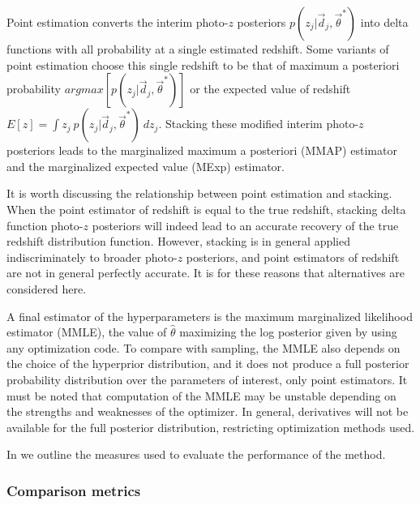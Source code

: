 Point estimation converts the interim photo-$z$ posteriors $p(z_{j}|\vec{d}_{j},\vec{\theta}^{*})$ into delta functions with all probability at a single estimated redshift.  
Some variants of point estimation choose this single redshift to be that of maximum a posteriori probability $argmax[p(z_{j}|\vec{d}_{j},\vec{\theta}^{*})]$ or the expected value of redshift $E[z]=\int z_{j}\ p(z_{j}|\vec{d}_{j},\vec{\theta}^{*})\ dz_{j}$.  
Stacking these modified interim photo-$z$ posteriors leads to the marginalized maximum a posteriori (MMAP) estimator and the marginalized expected value (MExp) estimator.

It is worth discussing the relationship between point estimation and stacking.  
When the point estimator of redshift is equal to the true redshift, stacking delta function photo-$z$ posteriors will indeed lead to an accurate recovery of the true redshift distribution function.  
However, stacking is in general applied indiscriminately to broader photo-$z$ posteriors, and point estimators of redshift are not in general perfectly accurate.  
It is for these reasons that alternatives are considered here.

A final estimator of the hyperparameters is the maximum marginalized likelihood estimator (MMLE), the value of $\hat{\theta}$ maximizing the log posterior given by  using any optimization code.  
To compare with sampling, the MMLE also depends on the choice of the hyperprior distribution, and it does not produce a full posterior probability distribution over the 
parameters of interest, only point estimators.  
It must be noted that computation of the MMLE may be unstable depending on the strengths and weaknesses of the optimizer.  
In general, derivatives will not be available for the full posterior distribution, restricting optimization methods used.

In  we outline the measures used to evaluate the performance of the method.

\subsubsection{Comparison metrics}


